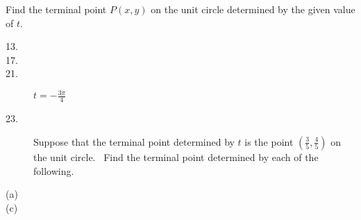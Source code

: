 Find the terminal point $P (x ,y)$ on the unit circle determined by the given value of $t$. 


\begin{description}
\item [13.]   
\columnsep =30pt
 

\item [17.]
\columnsep =30pt
 

\item [21.]
$t = -\frac{3 \pi }{4}$ 

\item [23.] Suppose that the terminal
point determined by $t$ is the point $\left (\frac{3}{5} ,\frac{4}{5}\right )$ on the unit circle. \ Find
the terminal point determined by each of the following. 

\item [(a)]
\columnsep =30pt
 

\item [(c)]
\columnsep =30pt
 \end{description}


